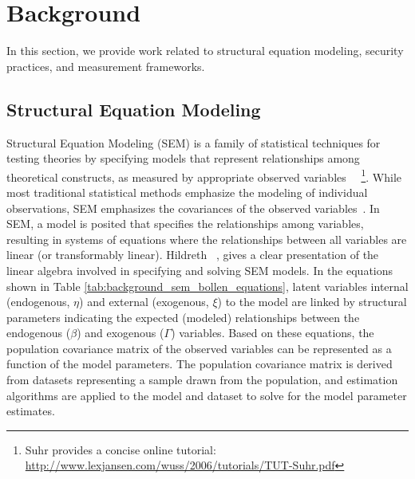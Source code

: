 \section{Background}
\label{sec:background}
In this section, we provide work related to structural equation modeling, security practices, and measurement frameworks.

\subsection{Structural Equation Modeling}

Structural Equation Modeling (SEM) is a family of statistical techniques for testing theories by specifying models that represent relationships among theoretical constructs, as measured by appropriate observed variables~\cite{kline2015principles} ~\footnote{Suhr provides a concise online tutorial: \url{http://www.lexjansen.com/wuss/2006/tutorials/TUT-Suhr.pdf}}. While most traditional statistical methods emphasize the modeling of individual observations, SEM emphasizes the covariances of the observed variables~\cite{hildreth2013residual}. In SEM, a model is posited that specifies the relationships among variables, resulting in systems of equations where the relationships between all variables are linear (or transformably linear). Hildreth ~\cite{hildreth2013residual}, gives a clear presentation of the linear algebra involved in specifying and solving SEM models. In the equations shown in Table \ref{tab:background_sem_bollen_equations}, latent variables internal (endogenous, $\eta$) and external (exogenous, $\xi$) to the model are linked by structural parameters indicating the expected (modeled) relationships between the endogenous ($\beta$) and exogenous ($\Gamma$) variables. Based on these equations, the population covariance matrix of the observed variables can be represented as a function of the model parameters. The population covariance matrix is derived from datasets representing a sample drawn from the population, and estimation algorithms are applied to the model and dataset to solve for the model parameter estimates. 
